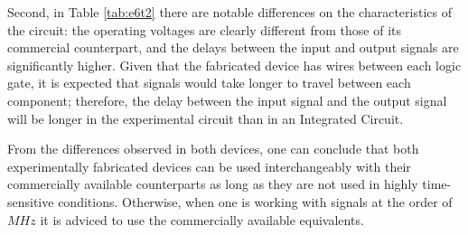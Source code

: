         Second, in Table \ref{tab:e6t2} there are notable differences on the characteristics of the circuit:
        the operating voltages are clearly different from those of its commercial counterpart, and the
        delays between the input and output signals are significantly higher. Given that the fabricated device
        has wires between each logic gate, it is expected that signals would take longer to travel between each
        component; therefore, the delay between the input signal and the output signal will be longer in the
        experimental circuit than in an Integrated Circuit.

        From the differences observed in both devices, one can conclude that both experimentally fabricated devices can
        be used interchangeably with their commercially available counterparts as long as they are not used in highly time-sensitive
        conditions. Otherwise, when one is working with signals at the order of $MHz$ it is adviced to use the commercially available
        equivalents.
\pagebreak
